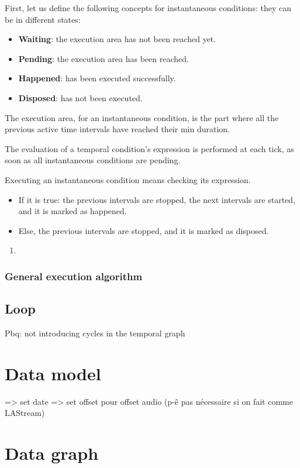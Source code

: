 \documentclass[applsci,article,submit,moreauthors,pdftex,10pt,a4paper]{mdpi}
\begin{document}
First, let us define the following concepts for instantaneous conditions: they can be in different states:
\begin{itemize}
\item \textbf{Waiting}: the execution area has not been reached yet.
\item \textbf{Pending}: the execution area has been reached.
\item \textbf{Happened}: has been executed successfully.
\item \textbf{Disposed}: has not been executed.
\end{itemize}

The execution area, for an instantaneous condition, is the part where all the previous active time intervals have reached their min duration.

The evaluation of a temporal condition's expression is performed at each tick, as soon as all instantaneous conditions are pending. 

Executing an instantaneous condition means checking its expression.
\begin{itemize}
\item If it is true: the previous intervals are stopped, the next intervals are started, and it is marked as happened. 
\item Else, the previous intervals are stopped, and it is marked as disposed.
\end{itemize}

\begin{enumerate}
\item 
\end{enumerate}
\subsubsection{General execution algorithm}

\subsection{Loop}\label{sec.loop}
Pbq: not introducing cycles in the temporal graph

\section{Data model}\label{sec.datamodel}
=> set date
=> set offset pour offset audio (p-ê pas nécessaire si on fait comme LAStream)

\section{Data graph}
\end{document}
